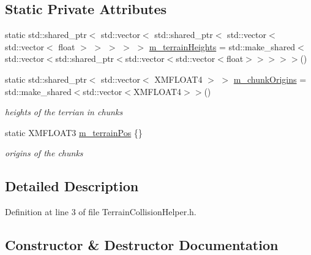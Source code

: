 \subsection*{Static Private Attributes}
\begin{DoxyCompactItemize}
\item 
static std\+::shared\+\_\+ptr$<$ std\+::vector$<$ std\+::shared\+\_\+ptr$<$ std\+::vector$<$ std\+::vector$<$ float $>$ $>$ $>$ $>$ $>$ \mbox{\hyperlink{class_terrain_collision_helper_a479800d07e04731ce3ac8093aba52fa0}{m\+\_\+terrain\+Heights}} = std\+::make\+\_\+shared$<$std\+::vector$<$std\+::shared\+\_\+ptr$<$std\+::vector$<$std\+::vector$<$float$>$$>$$>$$>$$>$()
\item 
static std\+::shared\+\_\+ptr$<$ std\+::vector$<$ X\+M\+F\+L\+O\+A\+T4 $>$ $>$ \mbox{\hyperlink{class_terrain_collision_helper_a49449b3d4ccf601ddca4200b5aa39b85}{m\+\_\+chunk\+Origins}} = std\+::make\+\_\+shared$<$std\+::vector$<$X\+M\+F\+L\+O\+A\+T4$>$$>$()
\begin{DoxyCompactList}\small\item\em heights of the terrian in chunks \end{DoxyCompactList}\item 
static X\+M\+F\+L\+O\+A\+T3 \mbox{\hyperlink{class_terrain_collision_helper_a6525b9bf4cf6d93fe66d87fff5a70aa3}{m\+\_\+terrain\+Pos}} \{\}
\begin{DoxyCompactList}\small\item\em origins of the chunks \end{DoxyCompactList}\end{DoxyCompactItemize}


\subsection{Detailed Description}


Definition at line 3 of file Terrain\+Collision\+Helper.\+h.



\subsection{Constructor \& Destructor Documentation}
\mbox{\label{class_terrain_collision_helper_a467eee1fdad8e365779f1ba2b0cbd9d6}} 
